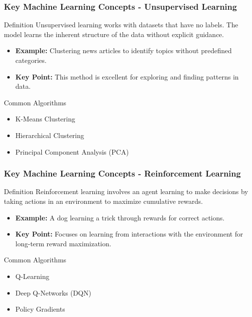\documentclass[aspectratio=169]{beamer}
\begin{document}
\begin{frame}[fragile]
    \frametitle{Key Machine Learning Concepts - Unsupervised Learning}
    \begin{block}{Definition}
        Unsupervised learning works with datasets that have no labels. The model learns the inherent structure of the data without explicit guidance.
    \end{block}
    \begin{itemize}
        \item \textbf{Example:} Clustering news articles to identify topics without predefined categories.
        \item \textbf{Key Point:} This method is excellent for exploring and finding patterns in data.
    \end{itemize}
    \begin{block}{Common Algorithms}
        \begin{itemize}
            \item K-Means Clustering
            \item Hierarchical Clustering
            \item Principal Component Analysis (PCA)
        \end{itemize}
    \end{block}
\end{frame}

\begin{frame}[fragile]
    \frametitle{Key Machine Learning Concepts - Reinforcement Learning}
    \begin{block}{Definition}
        Reinforcement learning involves an agent learning to make decisions by taking actions in an environment to maximize cumulative rewards.
    \end{block}
    \begin{itemize}
        \item \textbf{Example:} A dog learning a trick through rewards for correct actions.
        \item \textbf{Key Point:} Focuses on learning from interactions with the environment for long-term reward maximization.
    \end{itemize}
    \begin{block}{Common Algorithms}
        \begin{itemize}
            \item Q-Learning
            \item Deep Q-Networks (DQN)
            \item Policy Gradients
        \end{itemize}
    \end{block}
\end{frame}
\end{document}
